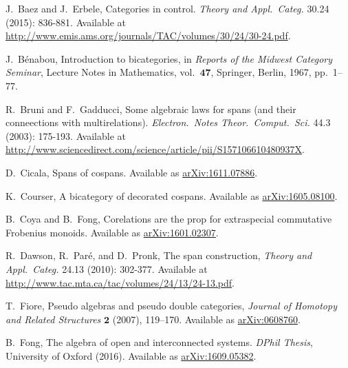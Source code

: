 \documentclass[11pt]{amsart}
\newcommand{\cat}[1]{\mathbf{#1}}
\theoremstyle{remark}
\theoremstyle{definition}
\begin{document}
%
%

%
\begin{thebibliography}{100}

J.~Baez and J.~Erbele,
Categories in control.
\emph{Theory and Appl.~Categ.} 
30.24 (2015): 836-881.
Available at \href{http://www.emis.ams.org/journals/TAC/volumes/30/24/30-24.pdf}{http://www.emis.ams.org/journals/TAC/volumes/30/24/30-24.pdf}.

J.~B\'enabou, 
Introduction to bicategories, 
in \emph{Reports of the Midwest Category Seminar}, 
Lecture Notes in Mathematics, 
vol.\ $\cat{47}$, 
Springer, Berlin, 1967, pp.\ 1--77. 

R.~Bruni and F.~Gadducci,
Some algebraic laws for spans (and their conneections with multirelations).
\emph{Electron.~Notes Theor.~Comput.~Sci.}
44.3 (2003): 175-193.
Available at \href{http://www.sciencedirect.com/science/article/pii/S157106610480937X}{http://www.sciencedirect.com/science/article/pii/S157106610480937X}.

D.~Cicala, 
Spans of cospans.
Available as \href{https://arxiv.org/abs/1611.07886}{arXiv:1611.07886}.

K.~Courser, 
A bicategory of decorated cospans. 
Available as \href{https://arxiv.org/pdf/1605.08100v2.pdf}{arXiv:1605.08100}.

B.~Coya and B.~Fong,
Corelations are the prop for extraspecial commutative Frobenius monoids.
Available as \href{https://arxiv.org/abs/1601.02307}{arXiv:1601.02307}.

R.~Dawson, R.~Par\'{e}, and D.~Pronk, 
The span construction, 
\emph{Theory and Appl.~Categ.} 
24.13 (2010): 302-377.
Available at \href{http://www.tac.mta.ca/tac/volumes/24/13/24-13.pdf}{http://www.tac.mta.ca/tac/volumes/24/13/24-13.pdf}.

T.~Fiore, 
Pseudo algebras and pseudo double categories, 
\emph{Journal of Homotopy and Related Structures} $\mathbf{2}$ 
(2007), 119--170. 
Available as \href{http://arxiv.org/abs/math/0608760}{arXiv:0608760}.

B.~Fong,
The algebra of open and interconnected systems.
\emph{DPhil Thesis},
University of Oxford (2016).
Available as \href{https://arxiv.org/abs/1609.05382}{arXiv:1609.05382}.


\end{thebibliography}
\end{document}
